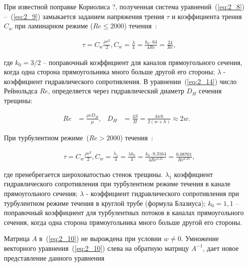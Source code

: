 При известной поправке Кориолиса ?, полученная система уравнений~(\ref{eq:2_8}) –~(\ref{eq:2_9}) замыкается заданием напряжения трения $\tau$ и коэффициента трения $C_w$ при ламинарном режиме ($Re \leq 2000$) течения~\cite{Idel4ik1}:

\begin{align}

&\tau = C_w \frac{\rho v^2 }{2}, C_w  = \frac{\lambda}{4} = \frac{k_0 \cdot 64}{4 Re} = \frac{24}{Re}, \label{eq:2_14}

\end{align}

где $k_0 = 3/2$ – поправочный коэффициент для каналов прямоугольного сечения, когда одна сторона прямоугольника много больше другой его стороны; $\lambda$ - коэффициент гидравлического сопротивления. В уравнении~(\ref{eq:2_14}) число Рейнольдса $Re$, определяется через гидравлический диаметр $D_H$ сечения трещины:

\begin{align}

Re &= \frac{\rho v D_H }{\mu} , & D_H & = \frac{4S}{\Pi} = \frac{4wh }{2 \left(w+h\right)} \approx 2w. \label{eq:2_15}

\end{align}



При турбулентном режиме~($Re>2000$) течения~\cite{Idel4ik1}:

\begin{align}

&\tau = C_w \frac{\rho v^2 }{2} ,  C_w  = \frac{\lambda_1}{4}= \frac{\lambda k_0}{4} = \frac{k_0 \cdot 0.3164}{4 Re^{0.25}} = \frac{0.08701}{Re^{0.25}}, \label{eq:2_16}

\end{align}

где пренебрегается шероховатостью стенок трещины. $\lambda_1$ коэффициент гидравлического сопротивления при турбулентном режиме течения в канале прямоугольного сечения; $\lambda$ - коэффициент гидравлического сопротивления при турбулентном режиме течения в круглой трубе (формула Блазиуса); $k_0 = 1,1$ – поправочный коэффициент для турбулентных потоков в каналах прямоугольного сечения, когда одна сторона прямоугольника много больше другой его стороны.



 \label{sec:3}

Матрица $A$ в~(\ref{eq:2_10}) не вырождена при условии $w \neq 0$. Умножение векторного уравнения~(\ref{eq:2_10}) слева на обратную матрицу $A^{-1}$, дает новое представление данного уравнения

